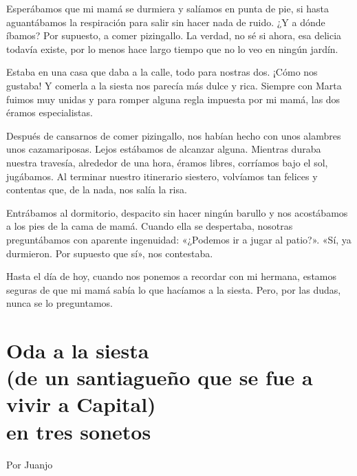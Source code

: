 \documentclass[11pt,twoside,openright,a5paper]{book}
\begin{document}
Esperábamos que  mi mamá se durmiera y salíamos en punta de pie, si hasta aguantábamos la respiración para salir sin hacer nada de ruido. ¿Y a dónde íbamos? Por supuesto, a comer pizingallo. La verdad, no sé si ahora, esa delicia todavía existe, por lo menos hace largo tiempo que no lo veo en ningún jardín.

Estaba en una casa que daba a la calle, todo para nostras dos. ¡Cómo nos gustaba! Y comerla a la siesta nos parecía más dulce y rica. Siempre con Marta fuimos muy unidas y para romper alguna regla impuesta por mi mamá, las dos éramos especialistas.

Después de cansarnos de comer pizingallo, nos habían hecho con  unos alambres unos cazamariposas. Lejos estábamos de alcanzar alguna. Mientras duraba nuestra travesía, alrededor de una hora, éramos libres, corríamos bajo el sol, jugábamos. Al terminar nuestro itinerario siestero, volvíamos tan felices y contentas que, de la nada, nos salía la risa.

Entrábamos al dormitorio, despacito sin hacer ningún barullo y nos acostábamos a los pies de la cama de mamá. Cuando ella se despertaba, nosotras preguntábamos con aparente ingenuidad: «¿Podemos ir a jugar al patio?». «Sí, ya durmieron. Por supuesto que sí», nos contestaba.

Hasta el día de hoy, cuando nos ponemos a recordar con mi hermana, estamos seguras de que mi mamá sabía lo que hacíamos a la siesta. Pero, por las dudas, nunca se lo preguntamos.

\section*{Oda a la siesta\\(de un santiagueño que se fue a vivir a Capital)\\
 en tres sonetos}

\begin{flushright}Por Juanjo\end{flushright}
\end{document}
